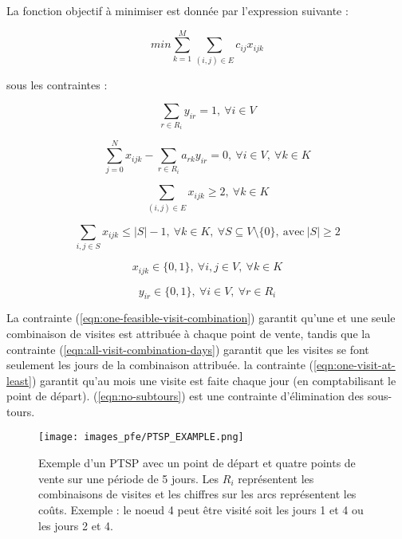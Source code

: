 La fonction objectif à minimiser est donnée par l'expression suivante :

\begin{equation*}
  min \sum_{k=1}^M \sum_{(i,j) \in E} c_{ij}x_{ijk}
\end{equation*}

sous les contraintes :

\begin{equation}
  \sum_{r \in R_i} y_{ir} = 1, \  \forall i \in V
  \label{eqn:one-feasible-visit-combination}
\end{equation}

\begin{equation}
  \sum_{j=0}^N x_{ijk} - \sum_{r \in R_i} a_{rk}y_{ir} = 0, \ \forall i \in V, \ \forall k \in K
  \label{eqn:all-visit-combination-days}
\end{equation}

\begin{equation}
  \sum_{(i,j) \in E} x_{ijk} \geqslant 2, \ \forall k \in K
  \label{eqn:one-visit-at-least}
\end{equation}

\begin{equation}
  \sum_{i,j \in S} x_{ijk} \leq |S| - 1, \ \forall k \in K, \ \forall S \subseteq V \setminus \{0\} , \ \textrm{avec} \ |S| \geqslant 2
  \label{eqn:no-subtours}
\end{equation}

\begin{equation}
  x_{ijk} \in \{0,1\}, \ \forall i,j \in V, \ \forall k \in K
\end{equation}

\begin{equation}
  y_{ir} \in \{0,1\}, \ \forall i \in V, \ \forall r \in R_i
\end{equation}

La contrainte (\ref{eqn:one-feasible-visit-combination}) garantit qu'une et une seule combinaison de visites est attribuée à chaque point de vente, tandis que la contrainte (\ref{eqn:all-visit-combination-days}) garantit que les visites se font seulement les jours de la combinaison attribuée. la contrainte (\ref{eqn:one-visit-at-least}) garantit qu'au mois une visite est faite chaque jour (en comptabilisant le point de départ). (\ref{eqn:no-subtours}) est une contrainte d'élimination des sous-tours.

\begin{figure}[hbt!]
  \centering
  \texttt{[image: images\_pfe/PTSP\_EXAMPLE.png]}
  \caption{Exemple d'un PTSP avec un point de départ et quatre points de vente sur une période de 5 jours. Les $R_i$ représentent les combinaisons de visites et les chiffres sur les arcs représentent les coûts. Exemple : le noeud 4 peut être visité soit les jours 1 et 4 ou les jours 2 et 4.}
  \label{fig:ptsp-example}
\end{figure}
\FloatBarrier

